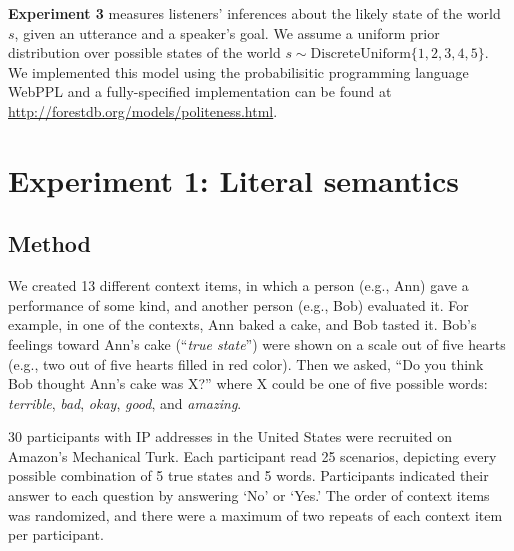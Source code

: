 \documentclass[10pt,letterpaper]{article}
\begin{document}
\textbf{Experiment 3} measures listeners' inferences about the likely state of the world $s$, given an utterance and a speaker's goal. 
We assume a uniform prior distribution over possible states of the world $s\sim \text{DiscreteUniform} \{1, 2, 3, 4, 5\}$. 
We implemented this model using the probabilisitic programming language WebPPL \cite{dippl} and a fully-specified implementation can be found at \url{http://forestdb.org/models/politeness.html}.

%



\section{Experiment 1: Literal semantics}

\subsection{Method}

We created 13 different context items, in which a person (e.g., Ann) gave a performance of some kind, and another person (e.g., Bob) evaluated it. For example, in one of the contexts, Ann baked a cake, and Bob tasted it. Bob's feelings toward Ann's cake (``\emph{true state}'') were shown on a scale out of five hearts (e.g., two out of five hearts filled in red color). Then we asked, ``Do you think Bob thought Ann's cake was X?'' where X could be one of five possible words: \emph{terrible}, \emph{bad}, \emph{okay}, \emph{good}, and \emph{amazing}.

30 participants with IP addresses in the United States were recruited on Amazon's Mechanical Turk. Each participant read 25 scenarios, depicting every possible combination of 5 true states and 5 words. Participants indicated their answer to each question by answering `No' or `Yes.' The order of context items was randomized, and there were a maximum of two repeats of each context item per participant.
\end{document}
